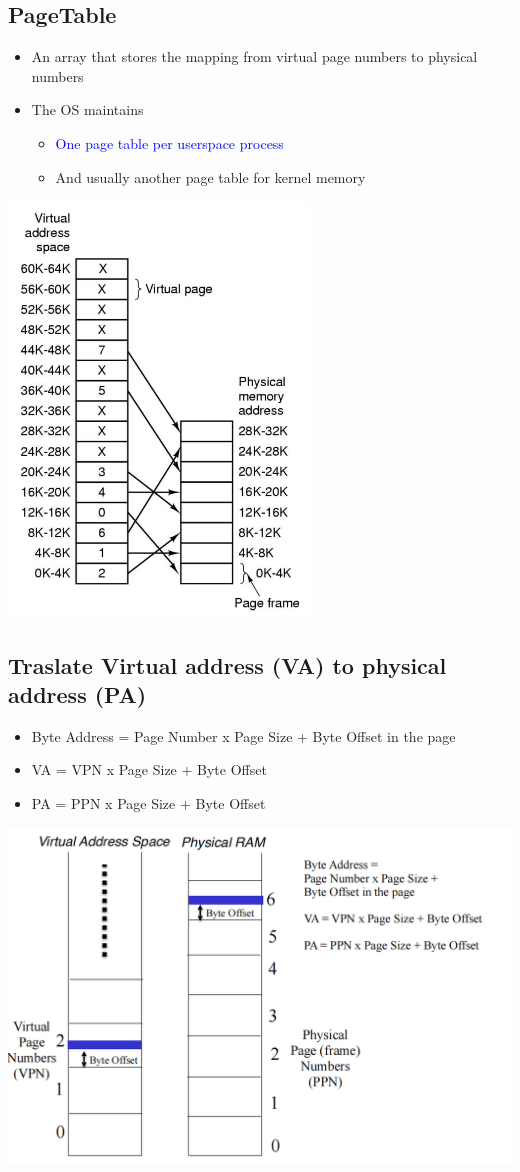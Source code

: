 \documentclass[12pt]{article}
\begin{document}
\subsection{PageTable}
\begin{itemize}
    \item An array that stores the mapping from virtual page numbers to physical numbers
    \item The OS maintains \begin{itemize}
        \item \textcolor{blue}{One page table per userspace process}
        \item And usually another page table for kernel memory
    \end{itemize}
\end{itemize}
\includegraphics[width=0.6\textwidth]{PageTable.png}
\subsection{Traslate Virtual address (VA) to physical address (PA)}
\begin{itemize}
    \item Byte Address = Page Number x Page Size + Byte Offset in the page
    \item VA = VPN x Page Size + Byte Offset
    \item PA = PPN x Page Size + Byte Offset
\end{itemize}
\includegraphics[width=\textwidth]{VAtoPA.png}
\end{document}
